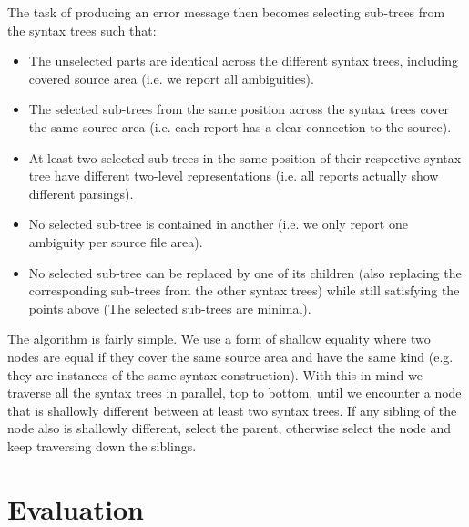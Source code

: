 \documentclass{kththesis}
\begin{document}
The task of producing an error message then becomes selecting sub-trees from the syntax trees such that:

\begin{itemize}
  \item The unselected parts are identical across the different syntax trees, including covered source area (i.e. we report all ambiguities).
  \item The selected sub-trees from the same position across the syntax trees cover the same source area (i.e. each report has a clear connection to the source).
  \item At least two selected sub-trees in the same position of their respective syntax tree have different two-level representations (i.e. all reports actually show different parsings).
  \item No selected sub-tree is contained in another (i.e. we only report one ambiguity per source file area).
  \item No selected sub-tree can be replaced by one of its children (also replacing the corresponding sub-trees from the other syntax trees) while still satisfying the points above (The selected sub-trees are minimal).
\end{itemize}

The algorithm is fairly simple. We use a form of shallow equality where two nodes are equal if they cover the same source area and have the same kind (e.g. they are instances of the same syntax construction). With this in mind we traverse all the syntax trees in parallel, top to bottom, until we encounter a node that is shallowly different between at least two syntax trees. If any sibling of the node also is shallowly different, select the parent, otherwise select the node and keep traversing down the siblings.


\chapter{Evaluation} \label{sec:evaluation}

\end{document}
